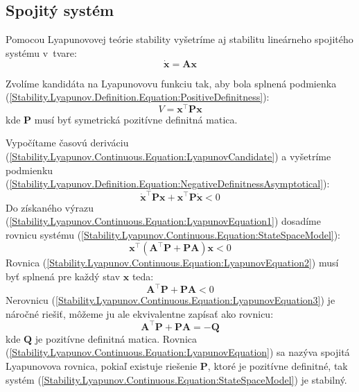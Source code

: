 \documentclass[a4paper, 10pt, ]{article}
\begin{document}
\subsection{Spojitý systém}
Pomocou Lyapunovovej teórie stability vyšetríme aj stabilitu lineárneho spojitého systému v~tvare:
\begin{equation}
    \label{Stability.Lyapunov.Continuous.Equation:StateSpaceModel}
    \dot{\bm{x}} = \bm{A} \bm{x}
\end{equation}

Zvolíme kandidáta na Lyapunovovu funkciu tak, aby bola splnená podmienka (\ref{Stability.Lyapunov.Definition.Equation:PositiveDefinitness}):
\begin{equation}
    \label{Stability.Lyapunov.Continuous.Equation:LyapunovCandidate}
    V = \bm{x}^\top \bm{P} \bm{x}
\end{equation}
kde $\bm{P}$ musí byť symetrická pozitívne definitná matica.

Vypočítame časovú deriváciu (\ref{Stability.Lyapunov.Continuous.Equation:LyapunovCandidate}) a vyšetríme podmienku (\ref{Stability.Lyapunov.Definition.Equation:NegativeDefinitnessAsymptotical}):
\begin{equation}
    \label{Stability.Lyapunov.Continuous.Equation:LyapunovEquation1}
    \dot{\bm{x}}^\top \bm{P} \bm{x} + \bm{x}^\top \bm{P} \dot{\bm{x}} < 0
\end{equation}
Do získaného výrazu (\ref{Stability.Lyapunov.Continuous.Equation:LyapunovEquation1}) dosadíme rovnicu systému (\ref{Stability.Lyapunov.Continuous.Equation:StateSpaceModel}):
\begin{equation}
    \label{Stability.Lyapunov.Continuous.Equation:LyapunovEquation2}
    \bm{x}^\top \left( \bm{A}^\top \bm{P} + \bm{P} \bm{A} \right) \bm{x} < 0
\end{equation}
Rovnica (\ref{Stability.Lyapunov.Continuous.Equation:LyapunovEquation2}) musí byť splnená pre každý stav $\bm{x}$ teda:
\begin{equation}
    \label{Stability.Lyapunov.Continuous.Equation:LyapunovEquation3}
    \bm{A}^\top \bm{P} + \bm{P} \bm{A} < 0
\end{equation}
Nerovnicu (\ref{Stability.Lyapunov.Continuous.Equation:LyapunovEquation3}) je náročné riešiť, môžeme ju ale ekvivalentne zapísať ako rovnicu: 
\begin{equation}
    \label{Stability.Lyapunov.Continuous.Equation:LyapunovEquation}
    \bm{A}^\top \bm{P} + \bm{P} \bm{A} = -\bm{Q}
\end{equation}
kde $\bm{Q}$ je pozitívne definitná matica. Rovnica (\ref{Stability.Lyapunov.Continuous.Equation:LyapunovEquation}) sa nazýva spojitá Lyapunovova rovnica, pokiaľ existuje riešenie $\bm{P}$, ktoré je pozitívne definitné, tak systém (\ref{Stability.Lyapunov.Continuous.Equation:StateSpaceModel}) je stabilný.
\end{document}
